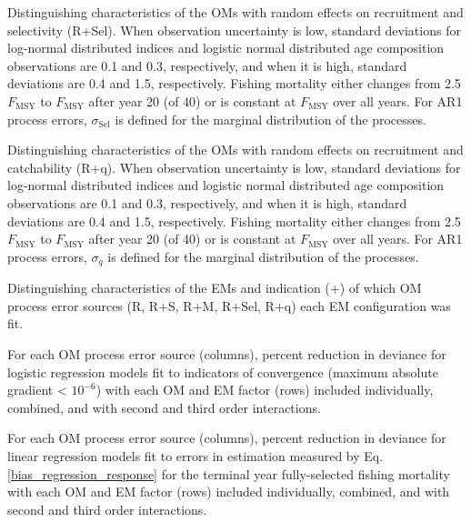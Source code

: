 \documentclass[
  12pt,
]{article}
\begin{document}
\begin{table}
\caption{Distinguishing characteristics of the OMs with random effects on recruitment and selectivity (R+Sel). When observation uncertainty is low, standard deviations for log-normal distributed indices and logistic normal distributed age composition observations are 0.1 and 0.3, respectively, and when it is high, standard deviations are 0.4 and 1.5, respectively. Fishing mortality either changes from 2.5$F_{\text{MSY}}$ to $F_{\text{MSY}}$ after year 20 (of 40) or is constant at $F_{\text{MSY}}$ over all years. For AR1 process errors, $\sigma_{\text{Sel}}$ is defined for the marginal distribution of the processes.}\label{sel_om_table}
{}
\end{table}

\begin{table}
\caption{Distinguishing characteristics of the OMs with random effects on recruitment and catchability (R+q). When observation uncertainty is low, standard deviations for log-normal distributed indices and logistic normal distributed age composition observations are 0.1 and 0.3, respectively, and when it is high, standard deviations are 0.4 and 1.5, respectively. Fishing mortality either changes from 2.5$F_{\text{MSY}}$ to $F_{\text{MSY}}$ after year 20 (of 40) or is constant at $F_{\text{MSY}}$ over all years. For AR1 process errors, $\sigma_q$ is defined for the marginal distribution of the processes.}\label{q_om_table}
{}
\end{table}

\begin{table}
\caption{Distinguishing characteristics of the EMs and indication (+) of which OM process error sources (R, R+S, R+M, R+Sel, R+q) each EM configuration was fit.}\label{em_table}
{\scriptsize }
\end{table}

\begin{table}
\caption{For each OM process error source (columns), percent reduction in deviance for logistic regression models fit to indicators of convergence (maximum absolute gradient < $10^{-6}$) with each OM and EM factor (rows) included individually, combined, and with second and third order interactions.}\label{convergence_gradient_PRD_table}
{}
\end{table}

\begin{table}
\caption{For each OM process error source (columns), percent reduction in deviance for linear regression models fit to errors in estimation measured by Eq. \ref{bias_regression_response} for the terminal year fully-selected fishing mortality with each OM and EM factor (rows) included individually, combined, and with second and third order interactions.}\label{bias_F_PRD_table}
{}
\end{table}
\end{document}
